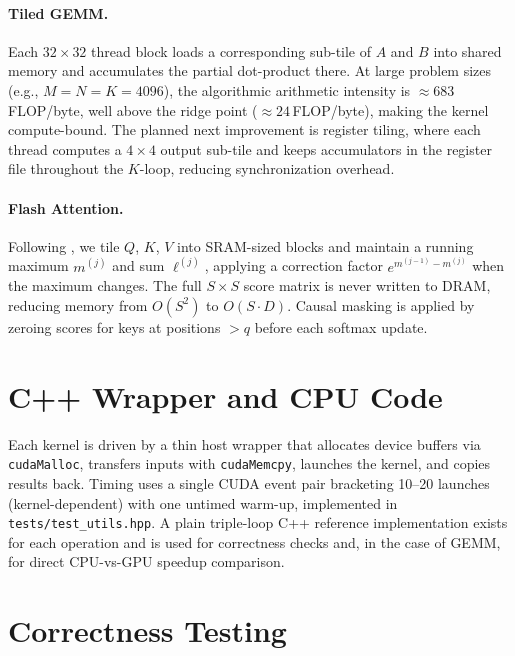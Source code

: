 \documentclass[11pt,letterpaper]{article}
\begin{document}
\paragraph{Tiled GEMM.}
Each $32{\times}32$ thread block loads a corresponding sub-tile of $A$ and $B$ into shared memory and accumulates the partial dot-product there. At large problem sizes (e.g., $M{=}N{=}K{=}4096$), the algorithmic arithmetic intensity is $\approx 683$\,FLOP/byte, well above the ridge point ($\approx 24$\,FLOP/byte), making the kernel compute-bound. The planned next improvement is register tiling, where each thread computes a $4{\times}4$ output sub-tile and keeps accumulators in the register file throughout the $K$-loop, reducing synchronization overhead.

\paragraph{Flash Attention.}
Following \cite{dao2022}, we tile $Q$, $K$, $V$ into SRAM-sized blocks and maintain a running maximum $m^{(j)}$ and sum $\ell^{(j)}$, applying a correction factor $e^{m^{(j-1)}-m^{(j)}}$ when the maximum changes. The full $S{\times}S$ score matrix is never written to DRAM, reducing memory from $O(S^2)$ to $O(S{\cdot}D)$. Causal masking is applied by zeroing scores for keys at positions $> q$ before each softmax update.

\section{C++ Wrapper and CPU Code}

Each kernel is driven by a thin host wrapper that allocates device buffers via \texttt{cudaMalloc}, transfers inputs with \texttt{cudaMemcpy}, launches the kernel, and copies results back. Timing uses a single CUDA event pair bracketing 10--20 launches (kernel-dependent) with one untimed warm-up, implemented in \texttt{tests/test\_utils.hpp}. A plain triple-loop C++ reference implementation exists for each operation and is used for correctness checks and, in the case of GEMM, for direct CPU-vs-GPU speedup comparison.

\section{Correctness Testing}
\end{document}
